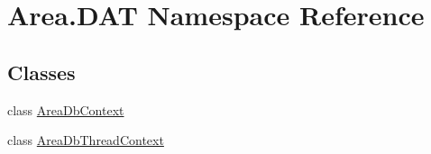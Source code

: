 \hypertarget{namespaceArea_1_1DAT}{}\section{Area.\+D\+AT Namespace Reference}
\label{namespaceArea_1_1DAT}
\subsection*{Classes}
\begin{DoxyCompactItemize}
\item 
class \mbox{\hyperlink{classArea_1_1DAT_1_1AreaDbContext}{Area\+Db\+Context}}
\item 
class \mbox{\hyperlink{classArea_1_1DAT_1_1AreaDbThreadContext}{Area\+Db\+Thread\+Context}}
\end{DoxyCompactItemize}
